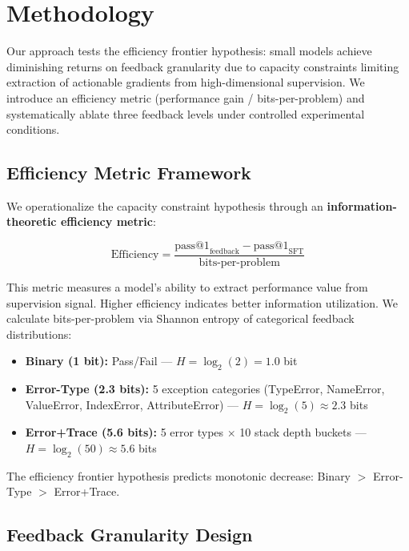 \section{Methodology}

Our approach tests the efficiency frontier hypothesis: small models achieve diminishing returns on feedback granularity due to capacity constraints limiting extraction of actionable gradients from high-dimensional supervision. We introduce an efficiency metric (performance gain / bits-per-problem) and systematically ablate three feedback levels under controlled experimental conditions.

\subsection{Efficiency Metric Framework}

We operationalize the capacity constraint hypothesis through an \textbf{information-theoretic efficiency metric}:

\begin{equation}
\text{Efficiency} = \frac{\text{pass@1}_{\text{feedback}} - \text{pass@1}_{\text{SFT}}}{\text{bits-per-problem}}
\end{equation}

This metric measures a model's ability to extract performance value from supervision signal. Higher efficiency indicates better information utilization. We calculate bits-per-problem via Shannon entropy of categorical feedback distributions:

\begin{itemize}
\item \textbf{Binary (1 bit):} Pass/Fail --- $H = \log_2(2) = 1.0$ bit
\item \textbf{Error-Type (2.3 bits):} 5 exception categories (TypeError, NameError, ValueError, IndexError, AttributeError) --- $H = \log_2(5) \approx 2.3$ bits
\item \textbf{Error+Trace (5.6 bits):} 5 error types $\times$ 10 stack depth buckets --- $H = \log_2(50) \approx 5.6$ bits
\end{itemize}

The efficiency frontier hypothesis predicts monotonic decrease: Binary $>$ Error-Type $>$ Error+Trace.

\subsection{Feedback Granularity Design}

